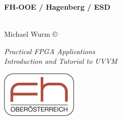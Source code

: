 


\author{Michael Wurm}



\newcommand{\UebungNr}{UVVM Tutorial}
\newcommand{\UebungTopic}{A brief introduction to UVVM, with a\\
	tutorial on how to use it in an example testbench.}

\clearpage

\newpage
\thispagestyle{empty}
\tableofcontents
\newpage
\setcounter{page}{1}  %

\thispagestyle{empty}
\begin{minipage}[b][2.4cm]{0.7\textwidth}
	\noindent
	\raggedright
	\begin{large}\textbf{%
			FH-OOE / Hagenberg / ESD\\
			\ \\
		}\end{large}
	Michael Wurm \copyright\,\the\year\\
	\begin{large}
		\textit{Practical FPGA Applications}\\
		\vspace{0.0em} \textit{Introduction and Tutorial to UVVM }%
	\end{large}
\end{minipage}
\hfill
\includegraphics[height=2.2cm]{./img/FhOOeLogoFeb2005}
\horizontalLine{0.12mm}

\lfoot{}
\cfoot{-\thepage-}
\rfoot{}
\noindent





